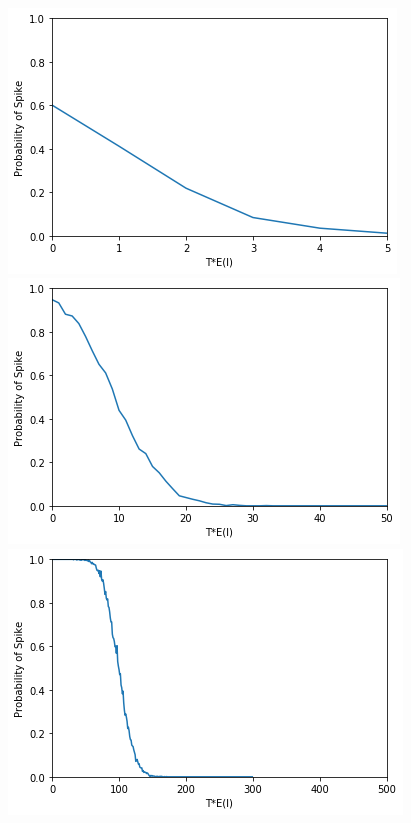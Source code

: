 \documentclass{article}
\begin{document}
\\
\begin{center}
    \includegraphics[scale = .6]{part4_10_5.png}
    \label{Bla?}
        \includegraphics[scale = .6]{part4_100_50.png}
        \includegraphics[scale = .6]{part4_1000_500.png}
\end{center}
\end{document}
